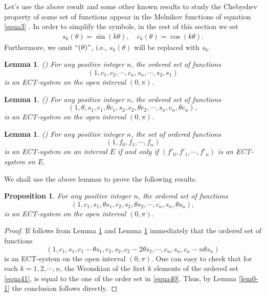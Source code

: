 \documentclass[11pt]{amsart}
\newtheorem{prop}[thm]{Proposition}
\newtheorem{lem}[thm]{Lemma}
\theoremstyle{remark}
\theoremstyle{definition}
\begin{document}
Let's use the above result and some other known results  to  study the Chebyshev property   of some set of functions appear in the Melnikov functions of equation \eqref{equa3} .
In order to  simplify the symbols, in the rest of this section we set
\begin{align*}
 s_k(\theta) = \sin(k\theta),  \quad  c_k(\theta) = \cos(k\theta).
\end{align*}
Furthermore, we  omit $``(\theta)"$,  i.e.,   $s_k(\theta)$ will be replaced with $s_k$.


\begin{lem} \label{lem3-1} \textsc{(}\cite{HL2022}\textsc{)} For any positive integer $n$, the  ordered set of functions
$$(1, c_1, c_2, \cdots, c_n, s_n,\cdots, s_2, s_1)$$
is an ECT-system on the open interval  $(0, \pi)$.
\end{lem}

\begin{lem}(\cite{HP2020}) \label{lem3-2} For any positive integer  $n$, the  ordered set of functions
$$(1, \theta,  s_1, c_1, \theta c_1,  s_2, c_2, \theta c_2,\cdots,  s_n,  c_n, \theta c_n),$$
is an ECT-system on the open interval  $(0, \pi)$.
\end{lem}



\begin{lem} (\cite{Kau1988}) \label{lem3-3} For any positive integer $n$, the set of ordered functions
$$(1, f_0,  f_1,  \cdots,  f_n)$$
is an ECT-system on an interval $E$ if and only if   $( f'_0,  f'_1,  \cdots,  f'_n )$ is an ECT-system on   $E$.
\end{lem}

We shall use the above lemmas to prove the following results.
\begin{prop} \label{prop3-2} For any positive integer $n$, the  ordered set of functions
\begin{equation} \label{equa40}(1, c_1, s_1,\theta s_1,  c_2, s_2, \theta s_2,\cdots,   c_n,  s_n, \theta s_n),\end{equation}
is an ECT-system on the open interval  $(0, \pi)$.
\end{prop}

\begin{proof}
If follows from Lemma \ref{lem3-2} and Lemma \ref{lem3-3} immediately
 that
  the  ordered set of functions
 \begin{equation} \label{equa41} (1, c_1, s_1, c_1-\theta s_1, c_2, s_2, c_2-2\theta s_2,
   \cdots, c_n, s_n,  c_n-n\theta s_n)\end{equation}
is an ECT-system on the open interval   $(0, \pi)$.
One can easy to   check that for each $k=1,2,\cdots, n$, the Wronskian of the first $k$ elements of the ordered set \eqref{equa41}, is equal to the one of the order set in \eqref{equa40}. Thus, by Lemma \ref{lem0-1}  the conclusion follows directly.




\end{proof}
\end{document}
